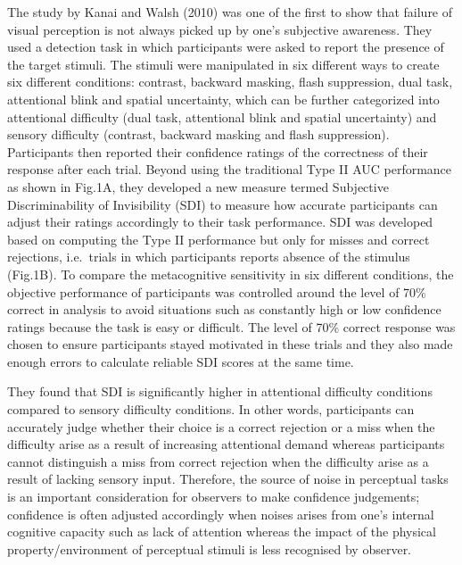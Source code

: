\documentclass[]{article}
\begin{document}
The study by Kanai and Walsh (2010) was one of the first to show that
failure of visual perception is not always picked up by one's subjective
awareness. They used a detection task in which participants were asked
to report the presence of the target stimuli. The stimuli were
manipulated in six different ways to create six different conditions:
contrast, backward masking, flash suppression, dual task, attentional
blink and spatial uncertainty, which can be further categorized into
attentional difficulty (dual task, attentional blink and spatial
uncertainty) and sensory difficulty (contrast, backward masking and
flash suppression). Participants then reported their confidence ratings
of the correctness of their response after each trial. Beyond using the
traditional Type II AUC performance as shown in Fig.1A, they developed a
new measure termed Subjective Discriminability of Invisibility (SDI) to
measure how accurate participants can adjust their ratings accordingly
to their task performance. SDI was developed based on computing the Type
II performance but only for misses and correct rejections, i.e.~trials
in which participants reports absence of the stimulus (Fig.1B). To
compare the metacognitive sensitivity in six different conditions, the
objective performance of participants was controlled around the level of
70\% correct in analysis to avoid situations such as constantly high or
low confidence ratings because the task is easy or difficult. The level
of 70\% correct response was chosen to ensure participants stayed
motivated in these trials and they also made enough errors to calculate
reliable SDI scores at the same time.

They found that SDI is significantly higher in attentional difficulty
conditions compared to sensory difficulty conditions. In other words,
participants can accurately judge whether their choice is a correct
rejection or a miss when the difficulty arise as a result of increasing
attentional demand whereas participants cannot distinguish a miss from
correct rejection when the difficulty arise as a result of lacking
sensory input. Therefore, the source of noise in perceptual tasks is an
important consideration for observers to make confidence judgements;
confidence is often adjusted accordingly when noises arises from one's
internal cognitive capacity such as lack of attention whereas the impact
of the physical property/environment of perceptual stimuli is less
recognised by observer.
\end{document}
